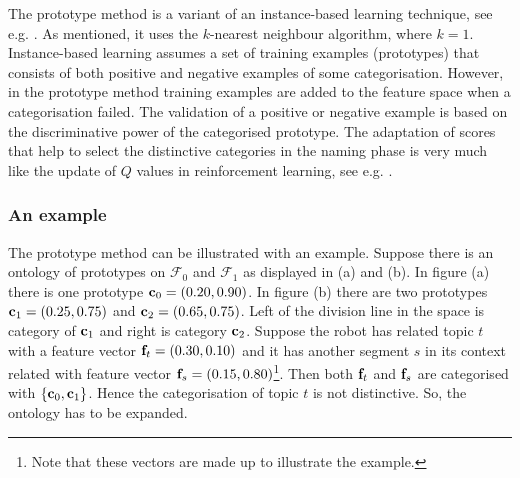 The prototype method is a variant of an instance-based learning technique, see e.g. \citep{ahaetal:1991,mitchell:1997}. As mentioned, it uses the $k$-nearest neighbour algorithm, where $k=1$. Instance-based learning assumes a set of training examples (prototypes) that consists of both positive and negative examples of some categorisation. However, in the prototype method training examples are added to the feature space when a categorisation failed. The validation of a positive or negative example is based on the discriminative power of the categorised prototype. The adaptation of scores that help to select the distinctive categories in the naming phase is very much like the update of $Q$ values in reinforcement learning, see e.g. \citep{suttonbarto:1998}. 

\subsubsection{An example}

The prototype method can be illustrated with an example. Suppose there is an ontology of prototypes on ${\mathcal F}_0$ and ${\mathcal F}_1$ as displayed in  (a) and (b). In figure (a) there is one prototype ${\bf c}_0=(0.20,0.90)$. In figure (b) there are two prototypes ${\bf c}_1=(0.25,0.75)$ and ${\bf c}_2=(0.65,0.75)$. Left of the division line in the space is category of ${\bf c}_1$ and right is category ${\bf c}_2$. Suppose the robot has related topic $t$ with a feature vector ${\bf f}_t=(0.30,0.10)$ and it has another segment $s$ in its context related with feature vector ${\bf f}_s=(0.15,0.80)$\footnote{Note that these vectors are made up to illustrate the example.}. Then both ${\bf f}_t$ and ${\bf f}_s$ are categorised with $\{{\bf c}_0,{\bf c}_1\}$. Hence the categorisation of topic $t$ is not distinctive. So, the ontology has to be expanded. 

